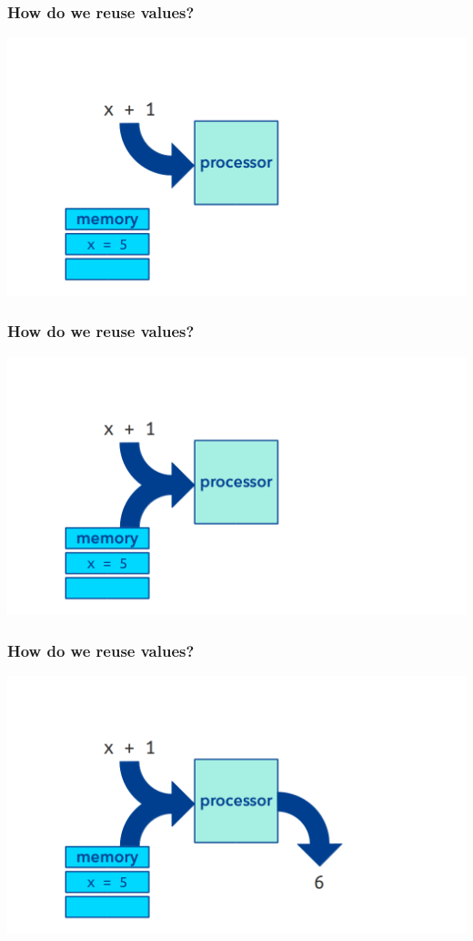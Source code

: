 \documentclass[11pt]{beamer}
\begin{document}
\begin{frame}
  \frametitle{How do we reuse values?}
  \includegraphics[width=\textwidth]{./img/computer-memory-3.png}
\end{frame}

\begin{frame}
  \frametitle{How do we reuse values?}
  \includegraphics[width=\textwidth]{./img/computer-memory-4.png}
\end{frame}

\begin{frame}
  \frametitle{How do we reuse values?}
  \includegraphics[width=\textwidth]{./img/computer-memory-5.png}
\end{frame}
\end{document}
